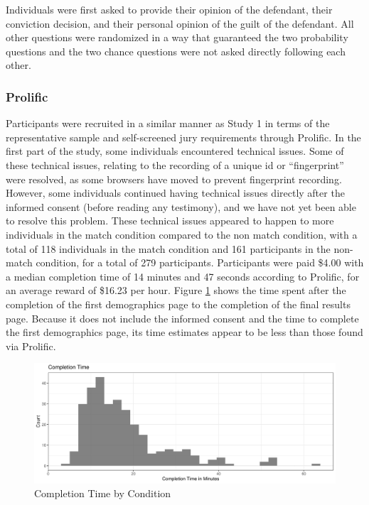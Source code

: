 \documentclass[print]{nuthesis}
\begin{document}
Individuals were first asked to provide their opinion of the defendant, their conviction decision, and their personal opinion of the guilt of the defendant.
All other questions were randomized in a way that guaranteed the two probability questions and the two chance questions were not asked directly following each other.

\hypertarget{prolific-1}{%
\subsubsection{Prolific}\label{prolific-1}}

Participants were recruited in a similar manner as Study 1 in terms of the representative sample and self-screened jury requirements through Prolific.
In the first part of the study, some individuals encountered technical issues.
Some of these technical issues, relating to the recording of a unique id or ``fingerprint'' were resolved, as some browsers have moved to prevent fingerprint recording.
However, some individuals continued having technical issues directly after the informed consent (before reading any testimony), and we have not yet been able to resolve this problem.
These technical issues appeared to happen to more individuals in the match condition compared to the non match condition, with a total of 118 individuals in the match condition and 161 participants in the non-match condition, for a total of 279 participants.
Participants were paid \$4.00 with a median completion time of 14 minutes and 47 seconds according to Prolific, for an average reward of \$16.23 per hour.
Figure \ref{fig:completiontime2} shows the time spent after the completion of the first demographics page to the completion of the final results page.
Because it does not include the informed consent and the time to complete the first demographics page, its time estimates appear to be less than those found via Prolific.

\begin{figure}

{\centering \includegraphics[width=\linewidth]{thesis_files/figure-latex/completiontime2-1} 

}

\caption{Completion Time by Condition}\label{fig:completiontime2}
\end{figure}
\end{document}
